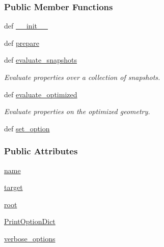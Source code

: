 \subsubsection*{\-Public \-Member \-Functions}
\begin{DoxyCompactItemize}
\item 
def \hyperlink{classforcebalance_1_1engine_1_1Engine_a907af5bf51d9ba4b010d6c2fa8cd85ff}{\-\_\-\-\_\-init\-\_\-\-\_\-}
\item 
def \hyperlink{classforcebalance_1_1engine_1_1Engine_a2eab57877002b41dc3742f0c67f2f24e}{prepare}
\item 
def \hyperlink{classforcebalance_1_1engine_1_1Engine_aceb1ac74d5f048dfbe620ceac7df8d32}{evaluate\-\_\-snapshots}
\begin{DoxyCompactList}\small\item\em \-Evaluate properties over a collection of snapshots. \end{DoxyCompactList}\item 
def \hyperlink{classforcebalance_1_1engine_1_1Engine_a0e88d58a45ebff5a5d741290e3589ee6}{evaluate\-\_\-optimized}
\begin{DoxyCompactList}\small\item\em \-Evaluate properties on the optimized geometry. \end{DoxyCompactList}\item 
def \hyperlink{classforcebalance_1_1BaseClass_a73e9a37a7632e79eb99f49bd15aced45}{set\-\_\-option}
\end{DoxyCompactItemize}
\subsubsection*{\-Public \-Attributes}
\begin{DoxyCompactItemize}
\item 
\hyperlink{classforcebalance_1_1engine_1_1Engine_ac8043b1c763d4a3ccc1a29ec99f4cd26}{name}
\item 
\hyperlink{classforcebalance_1_1engine_1_1Engine_a5e2383d62ef4df388a04c1c8b8409cab}{target}
\item 
\hyperlink{classforcebalance_1_1engine_1_1Engine_a7be99908e51fe6d616a665bf2ad70b1c}{root}
\item 
\hyperlink{classforcebalance_1_1BaseClass_afc6659278497d7245bc492ecf405ccae}{\-Print\-Option\-Dict}
\item 
\hyperlink{classforcebalance_1_1BaseClass_afd68efa29ccd2f320f4cf82198214aac}{verbose\-\_\-options}
\end{DoxyCompactItemize}



